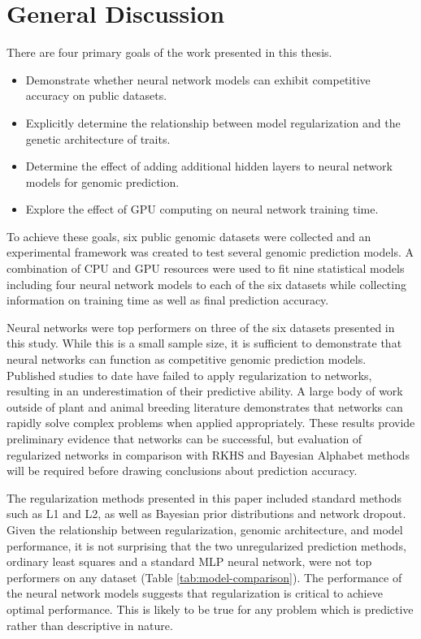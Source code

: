 \section{General Discussion}

There are four primary goals of the work presented in this thesis.

\begin{itemize}
    \item Demonstrate whether neural network models can exhibit competitive 
          accuracy on public datasets.
    \item Explicitly determine the relationship between model regularization and 
          the genetic architecture of traits. 
    \item Determine the effect of adding additional hidden layers to neural 
          network models for genomic prediction.
    \item Explore the effect of GPU computing on neural network training time.
\end{itemize}

To achieve these goals, six public genomic datasets were collected and an
experimental framework was created to test several genomic prediction models.
A combination of CPU and GPU resources were
used to fit nine statistical models including four neural network models
to each of the six datasets while collecting information on training 
time as well as final prediction accuracy. 

Neural networks were top performers on three of the six datasets
presented in this study. While this is a small sample size, it is
sufficient to demonstrate that neural networks can function as 
competitive genomic prediction models. Published studies to date have failed 
to apply regularization to networks, resulting in an underestimation 
of their predictive ability. A large body of work outside of plant 
and animal breeding literature demonstrates that networks can 
rapidly solve complex problems when applied appropriately.
These results provide preliminary evidence that networks can be successful,
but evaluation of regularized networks in comparison with RKHS and 
Bayesian Alphabet methods will be required before drawing conclusions about 
prediction accuracy.

The regularization methods presented in this paper included standard methods such 
as L1 and L2, as well as Bayesian prior distributions and network dropout. 
Given the relationship between regularization, genomic architecture, and model 
performance, it is not surprising that the two unregularized prediction methods, 
ordinary least squares and a standard MLP neural network, were not top performers 
on any dataset (Table \ref{tab:model-comparison}). The performance of the neural 
network models suggests that regularization is critical to achieve optimal 
performance. This is likely to be true for any problem which is predictive rather 
than descriptive in nature.

